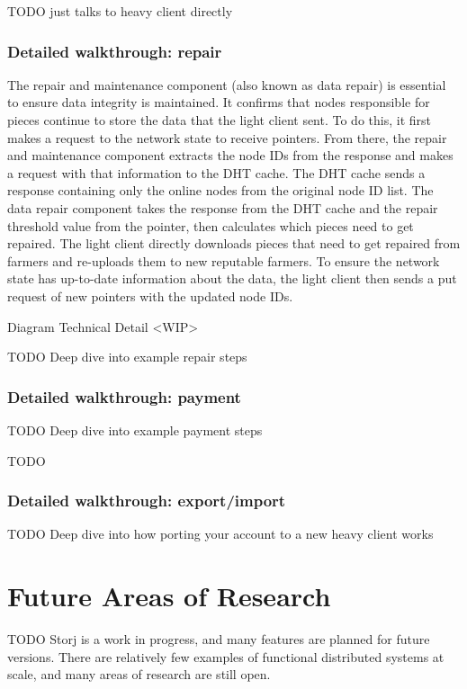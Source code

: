 \documentclass[a4paper,10pt]{article} \usepackage[utf8]{inputenc}
\newcommand{\todo}[1]{{\color{red} TODO #1 }}
\begin{document}
\todo{just talks to heavy client directly}

\subsubsection{Detailed walkthrough: repair}

The repair and maintenance component (also known as data
repair) is essential to ensure data integrity is maintained. It confirms that
nodes responsible for pieces continue to store the data that the light client
sent. To do this, it first makes a request to the network state to receive
pointers. From there, the repair and maintenance component extracts the node IDs
from the response and makes a request with that information to the DHT cache.
The DHT cache sends a response containing only the online nodes from the
original node ID list. The data repair component takes the response from the DHT
cache and the repair threshold value from the pointer, then calculates which
pieces need to get repaired. The light client directly downloads pieces that
need to get repaired from farmers and re-uploads them to new reputable farmers.
To ensure the network state has up-to-date information about the data, the light
client then sends a put request of new pointers with the updated node IDs.

Diagram Technical Detail <WIP>

\todo{Deep dive into example repair steps}

\subsubsection{Detailed walkthrough: payment}

\todo{Deep dive into example payment steps}

\todo{}

\subsubsection{Detailed walkthrough: export/import}

\todo{Deep dive into how porting your account to a new heavy client works}

\section{Future Areas of Research}\label{sec:future_work}

\todo{ Storj is a work in progress, and many features are planned for future
versions. There are relatively few examples of functional distributed systems at
scale, and many areas of research are still open. }
\end{document}
